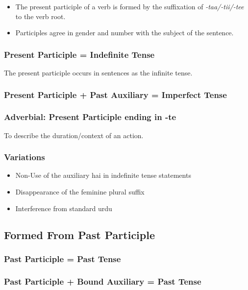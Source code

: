 \documentclass[a4paper]{article}
\begin{document}
\begin{itemize}
\item
The present participle of a verb is formed by the suffixation of \emph{-taa/-tii/-tee} to the verb root.
\item
Participles agree in gender and number with the subject of the sentence.
\end{itemize}

\subsubsection{Present Participle = Indefinite Tense}

The present participle occurs in sentences as the infinite tense.
\subsubsection{Present Participle + Past Auxiliary = Imperfect Tense}
\subsubsection{Adverbial: Present Participle ending in -te}

To describe the duration/context of an action.

\subsubsection{Variations}

\begin{itemize}
\item
Non-Use of the auxiliary hai in indefinite tense statements
\item
Disappearance of the feminine plural suffix
\item
Interference from standard urdu
\end{itemize}

\subsection{Formed From Past Participle}

\subsubsection{Past Participle = Past Tense}
\subsubsection{Past Participle + Bound Auxiliary = Past Tense}
\end{document}
